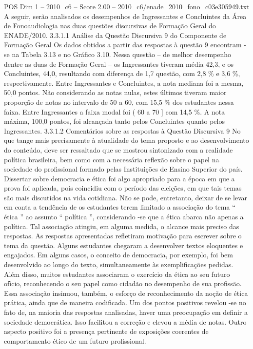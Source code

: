 \begin{textsample}{POS Dim 1 – 2010\_c6 – Score 2.00 – 2010\_c6/enade\_2010\_fono\_c03e305949.txt}
A seguir, serão analisados os desempenhos de Ingressantes e Concluintes da Área de Fonoaudiologia nas duas questões discursivas de Formação Geral do ENADE/2010. 3.3.1.1 Análise da Questão Discursiva 9 do Componente de Formação Geral Os dados obtidos a partir das respostas à questão 9 encontram -se na Tabela 3.13 e no Gráfico 3.10.
Nessa questão – de melhor desempenho dentre as duas de Formação Geral – os Ingressantes tiveram média 42,3, e os Concluintes, 44,0, resultando com diferença de 1,7 questão, com 2,8 \% e 3,6 \%, respectivamente.
Entre Ingressantes e Concluintes, a nota mediana foi a mesma, 50,0 pontos.
Não considerando as notas nulas, estes últimos tiveram maior proporção de notas no intervalo de 50 a 60, com 15,5 \% dos estudantes nessa faixa.
Entre Ingressantes a faixa modal foi ( 60 a 70 ] com 14,5 \%.
A nota máxima, 100,0 pontos, foi alcançada tanto pelos Concluintes quanto pelos Ingressantes. 3.3.1.2 Comentários sobre as respostas à Questão Discursiva 9 No que tange mais precisamente à atualidade do tema proposto e ao desenvolvimento do conteúdo, deve ser ressaltado que se mostrou sintonizado com a realidade política brasileira, bem como com a necessária reflexão sobre o papel na sociedade do profissional formado pelas Instituições de Ensino Superior do país.
Dissertar sobre democracia e ética foi algo apropriado para a época em que a prova foi aplicada, pois coincidiu com o período das eleições, em que tais temas são mais discutidos na vida cotidiana.
Não se pode, entretanto, deixar de se levar em conta a tendência de os estudantes terem limitado a associação do tema “ ética ” ao assunto “ política ”, considerando -se que a ética abarca não apenas a política.
Tal associação atingiu, em alguma medida, o alcance mais preciso das respostas.
As respostas apresentadas refletiram motivação para escrever sobre o tema da questão.
Alguns estudantes chegaram a desenvolver textos eloquentes e engajados.
Em alguns casos, o conceito de democracia, por exemplo, foi bem desenvolvido ao longo do texto, simultaneamente às exemplificações pedidas.
Além disso, muitos estudantes associaram o exercício da ética ao seu futuro ofício, reconhecendo o seu papel como cidadão no desempenho de sua profissão.
Essa associação insinuou, também, o esforço de reconhecimento da noção de ética prática, ainda que de maneira codificada.
Um dos pontos positivos revelou -se no fato de, na maioria das respostas analisadas, haver uma preocupação em definir a sociedade democrática.
Isso facilitou a correção e elevou a média de notas.
Outro aspecto positivo foi a presença pertinente de exposições coerentes de comportamento ético de um futuro profissional.

\end{textsample}
